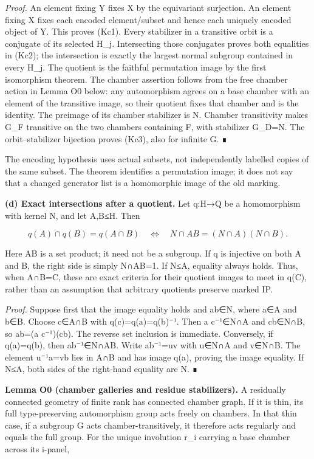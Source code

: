 \documentclass[
  10pt,
  letterpaper,
]{article}
\begin{document}
\emph{Proof.} An element fixing Y fixes X by the equivariant surjection.
An element fixing X fixes each encoded element/subset and hence each
uniquely encoded object of Y. This proves (Kc1). Every stabilizer in a
transitive orbit is a conjugate of its selected H\_j. Intersecting those
conjugates proves both equalities in (Kc2); the intersection is exactly
the largest normal subgroup contained in every H\_j. The quotient is the
faithful permutation image by the first isomorphism theorem. The chamber
assertion follows from the free chamber action in Lemma O0 below: any
automorphism agrees on a base chamber with an element of the transitive
image, so their quotient fixes that chamber and is the identity. The
preimage of its chamber stabilizer is N. Chamber transitivity makes G\_F
transitive on the two chambers containing F, with stabilizer G\_D=N. The
orbit--stabilizer bijection proves (Kc3), also for infinite G. ∎

The encoding hypothesis uses actual subsets, not independently labelled
copies of the same subset. The theorem identifies a permutation image;
it does not say that a changed generator list is a homomorphic image of
the old marking.

\textbf{(d) Exact intersections after a quotient.} Let q:H→Q be a
homomorphism with kernel N, and let A,B≤H. Then

\[
q(A)\cap q(B)=q(A\cap B)
\quad\Longleftrightarrow\quad
N\cap AB=(N\cap A)(N\cap B).
\tag{Kd1}
\]

Here AB is a set product; it need not be a subgroup. If q is injective
on both A and B, the right side is simply N∩AB=1. If N≤A, equality
always holds. Thus, when A∩B=C, these are exact criteria for their
quotient images to meet in q(C), rather than an assumption that
arbitrary quotients preserve marked IP.

\emph{Proof.} Suppose first that the image equality holds and ab∈N,
where a∈A and b∈B. Choose c∈A∩B with q(c)=q(a)=q(b)⁻¹. Then a c⁻¹∈N∩A
and cb∈N∩B, so ab=(a c⁻¹)(cb). The reverse set inclusion is immediate.
Conversely, if q(a)=q(b), then ab⁻¹∈N∩AB. Write ab⁻¹=uv with u∈N∩A and
v∈N∩B. The element u⁻¹a=vb lies in A∩B and has image q(a), proving the
image equality. If N≤A, both sides of the right-hand equality are N. ∎

\textbf{Lemma O0 (chamber galleries and residue stabilizers).} A
residually connected geometry of finite rank has connected chamber
graph. If it is thin, its full type-preserving automorphism group acts
freely on chambers. In that thin case, if a subgroup G acts
chamber-transitively, it therefore acts regularly and equals the full
group. For the unique involution r\_i carrying a base chamber across its
i-panel,
\end{document}
